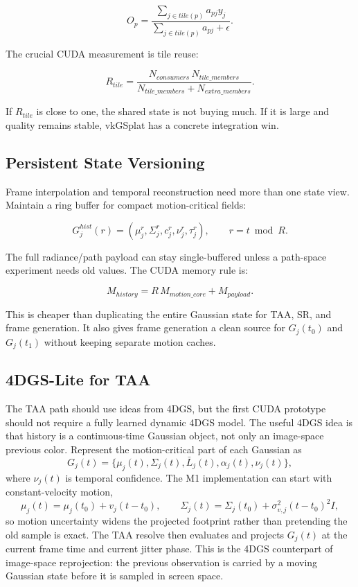\documentclass[11pt]{article}
\begin{document}
\[
  O_p =
  \frac{\sum_{j\in tile(p)} a_{pj} y_j}
       {\sum_{j\in tile(p)} a_{pj}+\epsilon}.
\]

The crucial CUDA measurement is tile reuse:

\[
  R_{tile}=
  \frac{N_{consumers}\,N_{tile\_members}}
       {N_{tile\_members}+N_{extra\_members}}.
\]

If $R_{tile}$ is close to one, the shared state is not buying much. If it is
large and quality remains stable, vkGSplat has a concrete integration win.

\subsection{Persistent State Versioning}

Frame interpolation and temporal reconstruction need more than one state view.
Maintain a ring buffer for compact motion-critical fields:

\[
  G_j^{hist}(r) =
  (\mu_j^r,\Sigma_j^r,c_j^r,\nu_j^r,\tau_j^r),
  \qquad
  r=t\bmod R.
\]

The full radiance/path payload can stay single-buffered unless a path-space
experiment needs old values. The CUDA memory rule is:

\[
  M_{history} =
  R\,M_{motion\_core} + M_{payload}.
\]

This is cheaper than duplicating the entire Gaussian state for TAA, SR, and
frame generation. It also gives frame generation a clean source for
$G_j(t_0)$ and $G_j(t_1)$ without keeping separate motion caches.

\subsection{4DGS-Lite for TAA}

The TAA path should use ideas from 4DGS, but the first CUDA prototype should
not require a fully learned dynamic 4DGS model. The useful 4DGS idea is that
history is a continuous-time Gaussian object, not only an image-space previous
color. Represent the motion-critical part of each Gaussian as
\[
  G_j(t)=
  \{\mu_j(t),\Sigma_j(t),\bar L_j(t),\alpha_j(t),\nu_j(t)\},
\]
where $\nu_j(t)$ is temporal confidence. The M1 implementation can start with
constant-velocity motion,
\[
  \mu_j(t)=\mu_j(t_0)+v_j(t-t_0),
  \qquad
  \Sigma_j(t)=\Sigma_j(t_0)+\sigma^2_{v,j}(t-t_0)^2 I,
\]
so motion uncertainty widens the projected footprint rather than pretending the
old sample is exact. The TAA resolve then evaluates and projects $G_j(t)$ at the
current frame time and current jitter phase. This is the 4DGS counterpart of
image-space reprojection: the previous observation is carried by a moving
Gaussian state before it is sampled in screen space.
\end{document}
